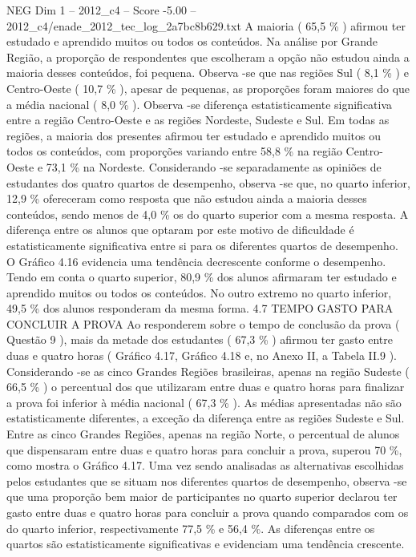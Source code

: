 \begin{textsample}{NEG Dim 1 – 2012\_c4 – Score -5.00 – 2012\_c4/enade\_2012\_tec\_log\_2a7bc8b629.txt}
A maioria ( 65,5 \% ) afirmou ter estudado e aprendido muitos ou todos os conteúdos.
Na análise por Grande Região, a proporção de respondentes que escolheram a opção não estudou ainda a maioria desses conteúdos, foi pequena.
Observa -se que nas regiões Sul ( 8,1 \% ) e Centro-Oeste ( 10,7 \% ), apesar de pequenas, as proporções foram maiores do que a média nacional ( 8,0 \% ).
Observa -se diferença estatisticamente significativa entre a região Centro-Oeste e as regiões Nordeste, Sudeste e Sul.
Em todas as regiões, a maioria dos presentes afirmou ter estudado e aprendido muitos ou todos os conteúdos, com proporções variando entre 58,8 \% na região Centro-Oeste e 73,1 \% na Nordeste.
Considerando -se separadamente as opiniões de estudantes dos quatro quartos de desempenho, observa -se que, no quarto inferior, 12,9 \% ofereceram como resposta que não estudou ainda a maioria desses conteúdos, sendo menos de 4,0 \% os do quarto superior com a mesma resposta.
A diferença entre os alunos que optaram por este motivo de dificuldade é estatisticamente significativa entre si para os diferentes quartos de desempenho.
O Gráfico 4.16 evidencia uma tendência decrescente conforme o desempenho.
Tendo em conta o quarto superior, 80,9 \% dos alunos afirmaram ter estudado e aprendido muitos ou todos os conteúdos.
No outro extremo no quarto inferior, 49,5 \% dos alunos responderam da mesma forma. 4.7 TEMPO GASTO PARA CONCLUIR A PROVA Ao responderem sobre o tempo de conclusão da prova ( Questão 9 ), mais da metade dos estudantes ( 67,3 \% ) afirmou ter gasto entre duas e quatro horas ( Gráfico 4.17, Gráfico 4.18 e, no Anexo II, a Tabela II.9 ).
Considerando -se as cinco Grandes Regiões brasileiras, apenas na região Sudeste ( 66,5 \% ) o percentual dos que utilizaram entre duas e quatro horas para finalizar a prova foi inferior à média nacional ( 67,3 \% ).
As médias apresentadas não são estatisticamente diferentes, a exceção da diferença entre as regiões Sudeste e Sul.
Entre as cinco Grandes Regiões, apenas na região Norte, o percentual de alunos que dispensaram entre duas e quatro horas para concluir a prova, superou 70 \%, como mostra o Gráfico 4.17.
Uma vez sendo analisadas as alternativas escolhidas pelos estudantes que se situam nos diferentes quartos de desempenho, observa -se que uma proporção bem maior de participantes no quarto superior declarou ter gasto entre duas e quatro horas para concluir a prova quando comparados com os do quarto inferior, respectivamente 77,5 \% e 56,4 \%.
As diferenças entre os quartos são estatisticamente significativas e evidenciam uma tendência crescente.

\end{textsample}
